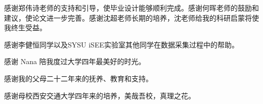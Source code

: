 
感谢郑伟诗老师的支持和引导，使毕业设计能够顺利完成。感谢何晖老师的鼓励和建议，使论文进一步完善。感谢沈超老师长期的培养，沈老师给我的科研启蒙将使我终生受益。

感谢李健恒同学以及SYSU iSEE实验室其他同学在数据采集过程中的帮助。

感谢 Nana 陪我度过大学四年最美好的时光。

感谢我的父母二十二年来的抚养、教育和支持。

感谢母校西安交通大学四年来的培养，美哉吾校，真理之花。
